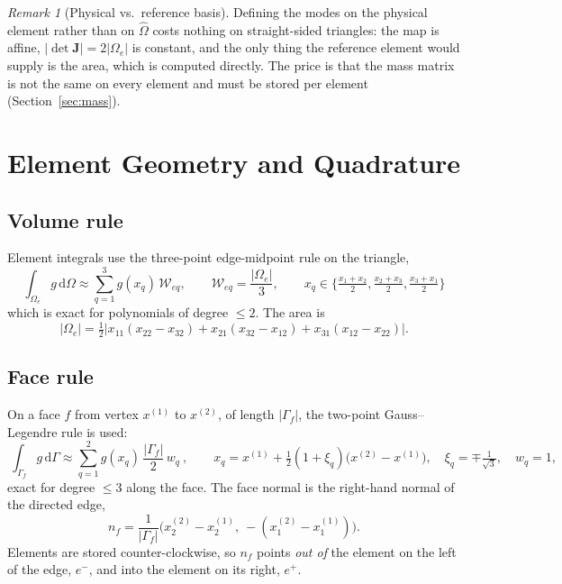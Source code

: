 \documentclass[11pt,a4paper]{article}
\theoremstyle{remark}
\newtheorem{remark}{Remark}
\theoremstyle{definition}
\newcommand{\dd}{\,\mathrm{d}}
\newcommand{\W}{\mathcal{W}}
\begin{document}
\begin{remark}[Physical vs.\ reference basis]
Defining the modes on the physical element rather than on $\hat\Omega$ costs nothing on straight-sided triangles: the map is affine, $|\det\mathbf{J}|=2|\Omega_e|$ is constant, and the only thing the reference element would supply is the area, which is computed directly. The price is that the mass matrix is not the same on every element and must be stored per element (Section~\ref{sec:mass}).
\end{remark}

\section{Element Geometry and Quadrature}

\subsection{Volume rule}
Element integrals use the three-point edge-midpoint rule on the triangle,
\begin{equation}\label{eq:volq}
\boxed{\ \int_{\Omega_e}g\dd\Omega\approx\sum_{q=1}^{3}g(x_q)\,\W_{eq},\qquad \W_{eq}=\frac{|\Omega_e|}{3},\qquad x_q\in\Big\{\tfrac{x_1+x_2}{2},\tfrac{x_2+x_3}{2},\tfrac{x_3+x_1}{2}\Big\}\ }
\end{equation}
which is exact for polynomials of degree $\le 2$. The area is
\[
|\Omega_e|=\tfrac12\big|x_{11}(x_{22}-x_{32})+x_{21}(x_{32}-x_{12})+x_{31}(x_{12}-x_{22})\big|.
\]

\subsection{Face rule}
On a face $f$ from vertex $x^{(1)}$ to $x^{(2)}$, of length $|\Gamma_f|$, the two-point Gauss--Legendre rule is used:
\begin{equation}\label{eq:faceq}
\boxed{\ \int_{\Gamma_f}g\dd\Gamma\approx\sum_{q=1}^{2}g(x_q)\,\frac{|\Gamma_f|}{2}\,w_q\ },\qquad x_q=x^{(1)}+\tfrac12(1+\xi_q)\big(x^{(2)}-x^{(1)}\big),\quad \xi_q=\mp\tfrac{1}{\sqrt3},\quad w_q=1,
\end{equation}
exact for degree $\le 3$ along the face. The face normal is the right-hand normal of the directed edge,
\begin{equation}\label{eq:normal}
n_f=\frac{1}{|\Gamma_f|}\big(x^{(2)}_2-x^{(1)}_2,\ -(x^{(2)}_1-x^{(1)}_1)\big).
\end{equation}
Elements are stored counter-clockwise, so $n_f$ points \emph{out of} the element on the left of the edge, $e^-$, and into the element on its right, $e^+$.
\end{document}
